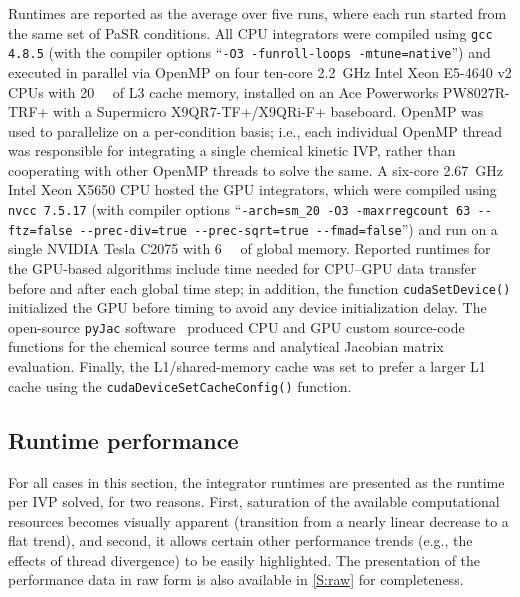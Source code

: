 \documentclass[preprint,review,11pt]{elsarticle}
\begin{document}
Runtimes are reported as the average over five runs, where each run started from the same set of PaSR conditions.
All CPU integrators were compiled using \texttt{gcc 4.8.5} (with the compiler options ``\texttt{-O3 -funroll-loops -mtune=native}'') and executed in parallel via OpenMP on four ten-core \SI{2.2}{\giga\hertz} Intel Xeon E5-4640 v2 CPUs with \SI{20}{\mega\byte} of L3 cache memory, installed on an Ace Powerworks PW8027R-TRF+ with a Supermicro X9QR7-TF+/X9QRi-F+ baseboard.
OpenMP was used to parallelize on a per-condition basis; i.e., each individual OpenMP thread was responsible for integrating a single chemical kinetic IVP, rather than cooperating with other OpenMP threads to solve the same.
A six-core \SI{2.67}{\giga\hertz} Intel Xeon X5650 CPU hosted the GPU integrators, which were compiled using \texttt{nvcc 7.5.17} (with compiler options ``\texttt{-arch=sm\_20 -O3 -maxrregcount 63 -{}-ftz=false -{}-prec-div=true -{}-prec-sqrt=true -{}-fmad=false}'') and run on a single NVIDIA Tesla C2075 with \SI{6}{\giga\byte} of global memory.
Reported runtimes for the GPU-based algorithms include time needed for CPU--GPU data transfer before and after each global time step; in addition, the function \texttt{cudaSetDevice()} initialized the GPU before timing to avoid any device initialization delay.
The open-source \texttt{pyJac} software~\cite{niemeyer_2016_51139,Niemeyer:2015ws,Niemeyer:2016aa} produced CPU and GPU custom source-code functions for the chemical source terms and analytical Jacobian matrix evaluation.
Finally, the L1\slash shared-memory cache was set to prefer a larger L1 cache using the \texttt{cudaDeviceSetCacheConfig()} function.

\subsection{Runtime performance}
\label{S:perf}

For all cases in this section, the integrator runtimes are presented as the runtime per IVP solved, for two reasons.
First, saturation of the available computational resources becomes visually apparent (transition from a nearly linear decrease to a flat trend), and second, it allows certain other performance trends (e.g., the effects of thread divergence) to be easily highlighted.
The presentation of the performance data in raw form is also available in \ref{S:raw} for completeness.
\end{document}
